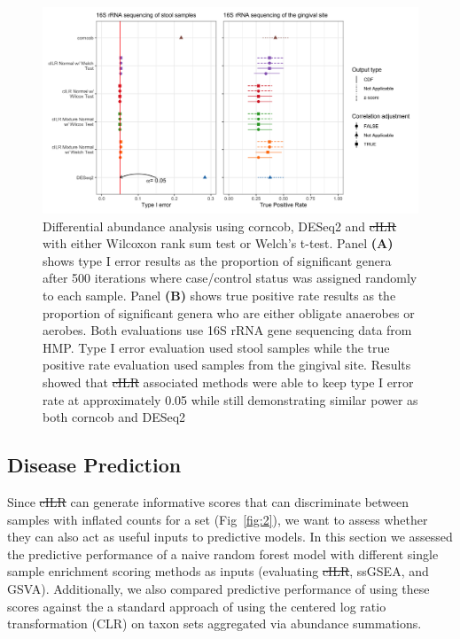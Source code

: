 \documentclass[10pt,letterpaper]{article}
\providecommand{\DIFaddtex}[1]{{\protect\color{blue}\uwave{#1}}} %
\providecommand{\DIFdeltex}[1]{{\protect\color{red}\sout{#1}}}                      %
\providecommand{\DIFaddbegin}{} %
\providecommand{\DIFaddend}{} %
\providecommand{\DIFdelbegin}{} %
\providecommand{\DIFdelend}{} %
\providecommand{\DIFaddFL}[1]{\DIFadd{#1}} %
\providecommand{\DIFdelFL}[1]{\DIFdel{#1}} %
\providecommand{\DIFaddbeginFL}{} %
\providecommand{\DIFaddendFL}{} %
\providecommand{\DIFdelbeginFL}{} %
\providecommand{\DIFdelendFL}{} %
\providecommand{\DIFadd}[1]{\texorpdfstring{\DIFaddtex{#1}}{#1}} %
\providecommand{\DIFdel}[1]{\texorpdfstring{\DIFdeltex{#1}}{}} %
\newcommand{\DIFscaledelfig}{0.5}
\newlength{\DIFdelgraphicswidth} %
\newlength{\DIFdelgraphicsheight} %
\newcommand{\DIFaddincludegraphics}[2][]{{\color{blue}\fbox{\DIFOincludegraphics[#1]{#2}}}} %
\newcommand{\DIFdelincludegraphics}[2][]{%
\sbox{\DIFdelgraphicsbox}{\DIFOincludegraphics[#1]{#2}}%
\settoboxwidth{\DIFdelgraphicswidth}{\DIFdelgraphicsbox} %
\settoboxtotalheight{\DIFdelgraphicsheight}{\DIFdelgraphicsbox} %
\scalebox{\DIFscaledelfig}{%
\parbox[b]{\DIFdelgraphicswidth}{\usebox{\DIFdelgraphicsbox}\\[-\baselineskip] \rule{\DIFdelgraphicswidth}{0em}}\llap{\resizebox{\DIFdelgraphicswidth}{\DIFdelgraphicsheight}{%
\setlength{\unitlength}{\DIFdelgraphicswidth}%
\begin{picture}(1,1)%
\thicklines\linethickness{2pt} %
{\color[rgb]{1,0,0}\put(0,0){\framebox(1,1){}}}%
{\color[rgb]{1,0,0}\put(0,0){\line( 1,1){1}}}%
{\color[rgb]{1,0,0}\put(0,1){\line(1,-1){1}}}%
\end{picture}%
}\hspace*{3pt}}} %
} %
\DeclareRobustCommand{\DIFaddbegin}{\DIFOaddbegin \let\includegraphics\DIFaddincludegraphics} %
\DeclareRobustCommand{\DIFaddend}{\DIFOaddend \let\includegraphics\DIFOincludegraphics} %
\DeclareRobustCommand{\DIFdelbegin}{\DIFOdelbegin \let\includegraphics\DIFdelincludegraphics} %
\DeclareRobustCommand{\DIFdelend}{\DIFOaddend \let\includegraphics\DIFOincludegraphics} %
\DeclareRobustCommand{\DIFaddbeginFL}{\DIFOaddbeginFL \let\includegraphics\DIFaddincludegraphics} %
\DeclareRobustCommand{\DIFaddendFL}{\DIFOaddendFL \let\includegraphics\DIFOincludegraphics} %
\DeclareRobustCommand{\DIFdelbeginFL}{\DIFOdelbeginFL \let\includegraphics\DIFdelincludegraphics} %
\DeclareRobustCommand{\DIFdelendFL}{\DIFOaddendFL \let\includegraphics\DIFOincludegraphics} %
\begin{document}
\begin{figure}[!h]
    \centering
    \includegraphics[width = \textwidth]{figures/data_diff_ab.png}
    \caption{Differential abundance analysis using corncob, DESeq2 and \DIFdelbeginFL \DIFdelFL{cILR }\DIFdelendFL \DIFaddbeginFL \DIFaddFL{CBEA }\DIFaddendFL with either Wilcoxon rank sum test or Welch's t-test. Panel \textbf{(A)} shows type I error results as the proportion of significant genera after 500 iterations where case/control status was assigned randomly to each sample. Panel \textbf{(B)} shows true positive rate results as the proportion of significant genera who are either obligate anaerobes or aerobes. Both evaluations use 16S rRNA gene sequencing data from HMP. Type I error evaluation used stool samples while the true positive rate evaluation used samples from the gingival site. Results showed that \DIFdelbeginFL \DIFdelFL{cILR }\DIFdelendFL \DIFaddbeginFL \DIFaddFL{CBEA }\DIFaddendFL associated methods were able to keep type I error rate at approximately 0.05 while still demonstrating similar power as both corncob and DESeq2} 
    \label{fig:5}
\end{figure}

\subsection*{Disease Prediction}   
Since \DIFdelbegin \DIFdel{cILR }\DIFdelend \DIFaddbegin \DIFadd{CBEA }\DIFaddend can generate informative scores that can discriminate between samples with inflated counts for a set (Fig~\ref{fig:2}), we want to assess whether they can also act as useful inputs to predictive models. In this section we assessed the predictive performance of a naive random forest model \cite{breiman2001} with different single sample enrichment scoring methods as inputs (evaluating \DIFdelbegin \DIFdel{cILR}\DIFdelend \DIFaddbegin \DIFadd{CBEA}\DIFaddend , ssGSEA, and GSVA). Additionally, we also compared predictive performance of using these scores against the a standard approach of using the centered log ratio transformation (CLR) on taxon sets aggregated via abundance summations.     
\end{document}
